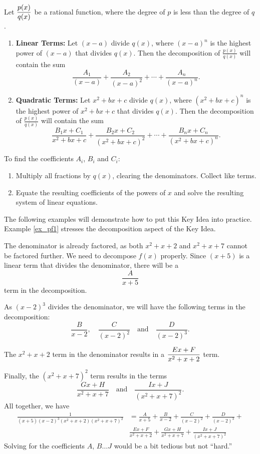 {Let $\displaystyle \frac{p(x)}{q(x)}$ be a rational function, where the degree of $p$ is less than the degree of $q$.
\begin{enumerate}
	\item	\textbf{Linear Terms:} Let $(x-a)$ divide $q(x)$, where $(x-a)^n$ is the highest power of $(x-a)$ that divides $q(x)$. Then the decomposition of $\frac{p(x)}{q(x)}$ will contain the sum
	$$\frac{A_1}{(x-a)} + \frac{A_2}{(x-a)^2} + \cdots +\frac{A_n}{(x-a)^n}.$$
	\item		\textbf{Quadratic Terms:} Let $x^2+bx+c$ divide $q(x)$, where $(x^2+bx+c)^n$ is the highest power of $x^2+bx+c$ that divides $q(x)$. Then the decomposition of $\frac{p(x)}{q(x)}$ will contain the sum 
	$$\frac{B_1x+C_1}{x^2+bx+c}+\frac{B_2x+C_2}{(x^2+bx+c)^2}+\cdots+\frac{B_nx+C_n}{(x^2+bx+c)^n}.$$
	\end{enumerate}
	To find the coefficients $A_i$, $B_i$ and $C_i$:
	\begin{enumerate}
	\item	Multiply all fractions by $q(x)$, clearing the denominators. Collect like terms.
	\item		Equate the resulting coefficients of the powers of $x$ and solve the resulting system of linear equations.
	\end{enumerate}
}

The following examples will demonstrate how to put this Key Idea into practice. Example \ref{ex_pf1} stresses the decomposition aspect of the Key Idea.\\

{The denominator is already factored, as both $x^2+x+2$ and $x^2+x+7$ cannot be factored further. We need to decompose $f(x)$ properly. Since $(x+5)$ is a linear term that divides the denominator, there will be a $$\frac{A}{x+5}$$ term in the decomposition.

As $(x-2)^3$ divides the denominator, we will have the following terms in the decomposition:
$$\frac{B}{x-2},\quad \frac{C}{(x-2)^2}\quad \text{and}\quad \frac{D}{(x-2)^3}.$$

The $x^2+x+2$ term in the denominator results in a $\displaystyle\frac{Ex+F}{x^2+x+2}$ term.

Finally, the $(x^2+x+7)^2$ term results in the terms $$\frac{Gx+H}{x^2+x+7}\quad \text{and}\quad \frac{Ix+J}{(x^2+x+7)^2}.$$
All together, we have 
\begin{align*}
\frac{1}{(x+5)(x-2)^3(x^2+x+2)(x^2+x+7)^2} &= \frac{A}{x+5} + \frac{B}{x-2}+ \frac{C}{(x-2)^2}+\frac{D}{(x-2)^3}+ \\
		& \frac{Ex+F}{x^2+x+2}+\frac{Gx+H}{x^2+x+7}+\frac{Ix+J}{(x^2+x+7)^2}
\end{align*}
Solving for the coefficients $A$, $B \ldots J$ would be a bit tedious but not ``hard.''
}\\

